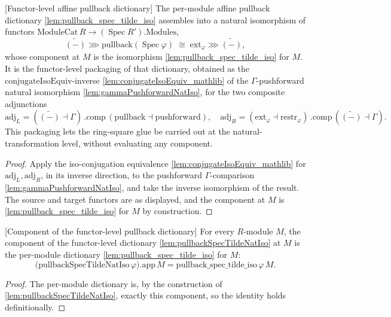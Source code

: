 \begin{lemma}

[Functor-level affine pullback dictionary]
  \label{lem:pullbackSpecTildeNatIso}
  The per-module affine pullback dictionary \cref{lem:pullback_spec_tilde_iso} assembles into a
  natural isomorphism of functors
  \(\mathrm{ModuleCat}\,R \to (\operatorname{Spec} R').\mathrm{Modules}\),
  \[
    \widetilde{(-)} \ggg \mathrm{pullback}(\operatorname{Spec}\varphi)
      \;\cong\;
    \mathrm{ext}_\varphi \ggg \widetilde{(-)},
  \]
  whose component at \(M\) is the isomorphism \cref{lem:pullback_spec_tilde_iso} for \(M\). It is the
  functor-level packaging of that dictionary, obtained as the
  \(\mathrm{conjugateIsoEquiv}\)-inverse \cref{lem:conjugateIsoEquiv_mathlib} of the
  \(\Gamma\)-pushforward natural isomorphism \cref{lem:gammaPushforwardNatIso}, for the two composite
  adjunctions
  \[
    \mathrm{adj}_L = (\widetilde{(-)}\dashv\Gamma)\,.\mathrm{comp}\,
      (\mathrm{pullback}\dashv\mathrm{pushforward}),
    \quad
    \mathrm{adj}_R = (\mathrm{ext}_\varphi\dashv\mathrm{restr}_\varphi)\,.\mathrm{comp}\,
      (\widetilde{(-)}\dashv\Gamma).
  \]
  This packaging lets the ring-square glue be carried out at the natural-transformation level, without
  evaluating any component.
  \begin{proof}
    Apply the iso-conjugation equivalence \cref{lem:conjugateIsoEquiv_mathlib} for
    \(\mathrm{adj}_L,\mathrm{adj}_R\), in its inverse direction, to the pushforward
    \(\Gamma\)-comparison \cref{lem:gammaPushforwardNatIso}, and take the inverse isomorphism of the
    result. The source and target functors are as displayed, and the component at \(M\) is
    \cref{lem:pullback_spec_tilde_iso} for \(M\) by construction.
  \end{proof}
\end{lemma}

\begin{lemma}

[Component of the functor-level pullback dictionary]
  \label{lem:pullbackSpecTildeNatIso_app}
  For every \(R\)-module \(M\), the component of the functor-level dictionary
  \cref{lem:pullbackSpecTildeNatIso} at \(M\) is the per-module dictionary
  \cref{lem:pullback_spec_tilde_iso} for \(M\):
  \[
    \bigl(\mathrm{pullbackSpecTildeNatIso}\,\varphi\bigr).\mathrm{app}\,M
      = \mathrm{pullback\_spec\_tilde\_iso}\,\varphi\,M .
  \]
  \begin{proof}
    The per-module dictionary is, by the construction of \cref{lem:pullbackSpecTildeNatIso}, exactly
    this component, so the identity holds definitionally.
  \end{proof}
\end{lemma}

